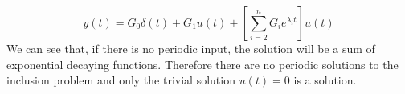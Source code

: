 \begin{equation}
    y(t) = G_0\delta(t) + G_1u(t) + \left[\sum_{i = 2}^{n} G_ie^{\lambda_i t} \right]u(t)
\end{equation}
We can see that, if there is no periodic input, the solution will be a sum of exponential decaying functions. Therefore there are no periodic solutions to the inclusion problem and only the trivial solution $u(t) = 0$ is a solution.